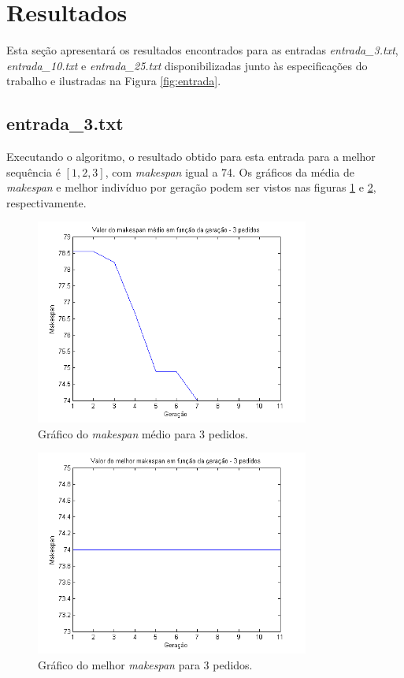 \documentclass[12pt]{elsarticle}
\begin{document}
	\section{Resultados}
	Esta seção apresentará os resultados encontrados para as entradas \textit{entrada\_3.txt}, \textit{entrada\_10.txt} e \textit{entrada\_25.txt} disponibilizadas junto às especificações do trabalho e ilustradas na Figura \ref{fig:entrada}.
	
	\subsection{entrada\_3.txt}
	Executando o algoritmo, o resultado obtido para esta entrada para a melhor sequência é $[1, 2, 3]$, com \textit{makespan} igual a 74. Os gráficos da média de \textit{makespan} e melhor indivíduo por geração podem ser vistos nas figuras \ref{fig:fit_3_medio} e \ref{fig:fit_3_best}, respectivamente.
	\begin{figure}[h]
		\centering
		\includegraphics[width=9cm]{img/fit_3_medio.png}
		\caption{Gráfico do \textit{makespan} médio para 3 pedidos.}
		\label{fig:fit_3_medio}
	\end{figure}
	\begin{figure}[h]
		\centering
		\includegraphics[width=9cm]{img/fit_3_best.png}
		\caption{Gráfico do melhor \textit{makespan} para 3 pedidos.}
		\label{fig:fit_3_best}
	\end{figure}
	
\end{document}
